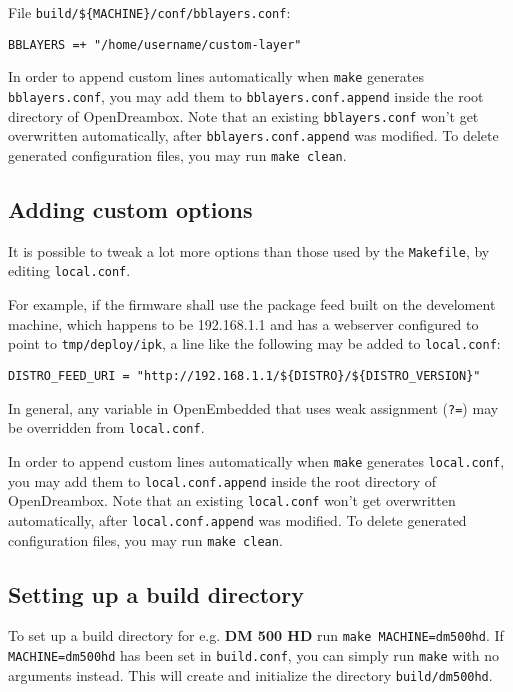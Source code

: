 \documentclass[a4paper]{article}
\newcommand{\shell}[1]{\texttt{\small #1}}
\begin{document}
     File \shell{build/\$\{MACHINE\}/conf/bblayers.conf}:

     \shell{BBLAYERS =+ "/home/username/custom-layer"}

     In order to append custom lines automatically when \shell{make} generates
     \shell{bblayers.conf}, you may add them to \shell{bblayers.conf.append}
     inside the root directory of OpenDreambox. Note that an existing \shell{bblayers.conf}
     won't get overwritten automatically, after \shell{bblayers.conf.append}
     was modified. To delete generated configuration files, you may run \shell{make clean}.

  \subsection{Adding custom options}
     It is possible to tweak a lot more options than those used by the
     \shell{Makefile}, by editing \shell{local.conf}.

     For example, if the firmware shall use the package feed built on the develoment machine, which
     happens to be 192.168.1.1 and has a webserver configured to point to \shell{tmp/deploy/ipk},
     a line like the following may be added to \shell{local.conf}:

     \shell{DISTRO\_FEED\_URI = "http://192.168.1.1/\$\{DISTRO\}/\$\{DISTRO\_VERSION\}"}

     In general, any variable in OpenEmbedded that uses weak assignment (\shell{?=}) may be
     overridden from \shell{local.conf}.

     In order to append custom lines automatically when \shell{make} generates
     \shell{local.conf}, you may add them to \shell{local.conf.append}
     inside the root directory of OpenDreambox. Note that an existing \shell{local.conf}
     won't get overwritten automatically, after \shell{local.conf.append}
     was modified. To delete generated configuration files, you may run \shell{make clean}.

  \subsection{Setting up a build directory}
     To set up a build directory for e.g. \textbf{DM 500 HD} run \shell{make MACHINE=dm500hd}. If
     \shell{MACHINE=dm500hd} has been set in \shell{build.conf}, you can simply run \shell{make}
     with no arguments instead. This will create and initialize the directory \shell{build/dm500hd}.
\end{document}
